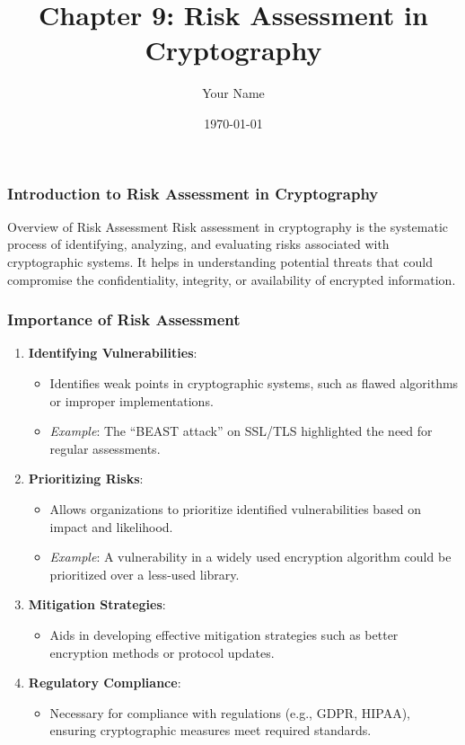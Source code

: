 \documentclass{beamer}
\title{Chapter 9: Risk Assessment in Cryptography}
\author{Your Name}
\institute{Your Institution}
\date{\today}
\begin{document}
\frame{\titlepage}

\begin{frame}[fragile]
    \frametitle{Introduction to Risk Assessment in Cryptography}
    \begin{block}{Overview of Risk Assessment}
        Risk assessment in cryptography is the systematic process of identifying, analyzing, and evaluating risks associated with cryptographic systems. It helps in understanding potential threats that could compromise the confidentiality, integrity, or availability of encrypted information.
    \end{block}
\end{frame}

\begin{frame}[fragile]
    \frametitle{Importance of Risk Assessment}
    \begin{enumerate}
        \item \textbf{Identifying Vulnerabilities}:
            \begin{itemize}
                \item Identifies weak points in cryptographic systems, such as flawed algorithms or improper implementations.
                \item \textit{Example}: The “BEAST attack” on SSL/TLS highlighted the need for regular assessments.
            \end{itemize}
        
        \item \textbf{Prioritizing Risks}:
            \begin{itemize}
                \item Allows organizations to prioritize identified vulnerabilities based on impact and likelihood.
                \item \textit{Example}: A vulnerability in a widely used encryption algorithm could be prioritized over a less-used library.
            \end{itemize}
        
        \item \textbf{Mitigation Strategies}:
            \begin{itemize}
                \item Aids in developing effective mitigation strategies such as better encryption methods or protocol updates.
            \end{itemize}
        
        \item \textbf{Regulatory Compliance}:
            \begin{itemize}
                \item Necessary for compliance with regulations (e.g., GDPR, HIPAA), ensuring cryptographic measures meet required standards.
            \end{itemize}
    \end{enumerate}
\end{frame}
\end{document}
